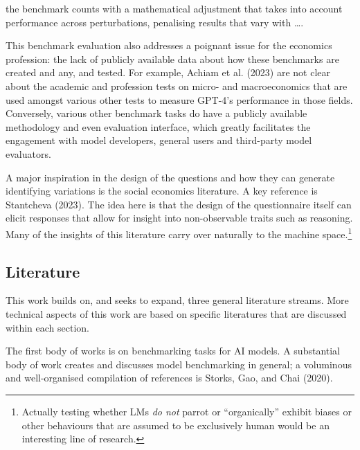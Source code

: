 \documentclass[
]{article}
\begin{document}
the benchmark counts with a mathematical adjustment that takes into
account performance across perturbations, penalising results that vary
with \ldots.

This benchmark evaluation also addresses a poignant issue for the
economics profession: the lack of publicly available data about how
these benchmarks are created and any, and tested. For example, Achiam et
al. (2023) are not clear about the academic and profession tests on
micro- and macroeconomics that are used amongst various other tests to
measure GPT-4's performance in those fields. Conversely, various other
benchmark tasks do have a publicly available methodology and even
evaluation interface, which greatly facilitates the engagement with
model developers, general users and third-party model evaluators.

A major inspiration in the design of the questions and how they can
generate identifying variations is the social economics literature. A
key reference is Stantcheva (2023). The idea here is that the design of
the questionnaire itself can elicit responses that allow for insight
into non-observable traits such as reasoning. Many of the insights of
this literature carry over naturally to the machine space.\footnote{Actually
  testing whether LMs \emph{do not} parrot or ``organically'' exhibit
  biases or other behaviours that are assumed to be exclusively human
  would be an interesting line of research.}

\subsection{Literature}\label{literature}

This work builds on, and seeks to expand, three general literature
streams. More technical aspects of this work are based on specific
literatures that are discussed within each section.

The first body of works is on benchmarking tasks for AI models. A
substantial body of work creates and discusses model benchmarking in
general; a voluminous and well-organised compilation of references is
Storks, Gao, and Chai (2020).
\end{document}
